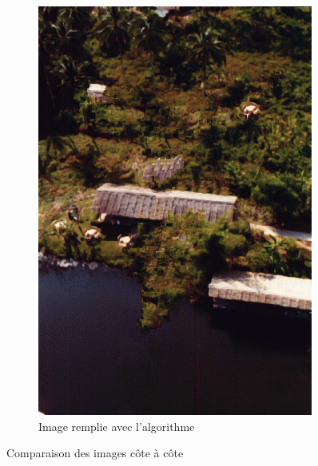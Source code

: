 \documentclass[10pt]{article}
\begin{document}
\begin{figure}[h]
\begin{subfigure}{0.3\textwidth}
        \includegraphics[width=\textwidth]{images/bungee_inpaint.png}
        \caption{Image remplie avec l'algorithme}
    \end{subfigure}
    \caption{Comparaison des images côte à côte}
\end{figure}
\end{document}

